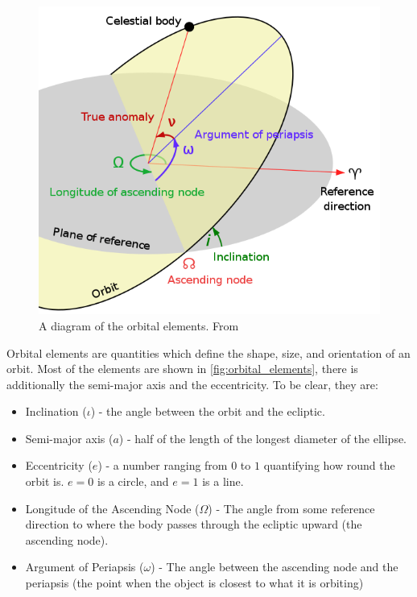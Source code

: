 \documentclass[a4paper,12pt]{article} %
\numberwithin{equation}{section} %
\numberwithin{figure}{section} %
\begin{document}
\begin{figure}[h!]
  \centering
  \includegraphics[scale=0.4]{OrbitalElements.png}
  \caption{A diagram of the orbital elements. From \cite{orbital_elements}}
  \label{fig:orbital_elements}
\end{figure}

Orbital elements are quantities which define the shape, size, and orientation of an orbit. Most of the elements are shown in \autoref{fig:orbital_elements}, there is additionally the semi-major axis and the eccentricity. To be clear, they are:

\begin{itemize}
  \item Inclination ($\iota$) - the angle between the orbit and the ecliptic.
  \item Semi-major axis ($a$) - half of the length of the longest diameter of the ellipse.
  \item Eccentricity ($e$) - a number ranging from $0$ to $1$ quantifying how round the orbit is. $e=0$ is a circle, and $e=1$ is a line.
  \item Longitude of the Ascending Node ($\Omega$) - The angle from some reference direction to where the body passes through the ecliptic upward (the ascending node).
  \item Argument of Periapsis ($\omega$) - The angle between the ascending node and the periapsis (the point when the object is closest to what it is orbiting)
\end{itemize}
\end{document}
